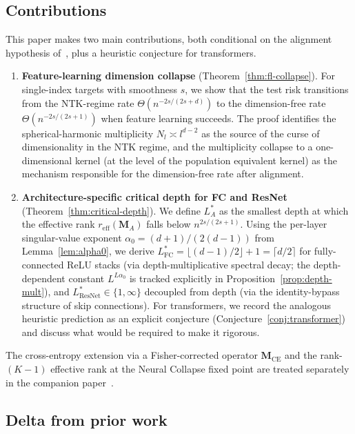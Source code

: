 \documentclass[12pt]{amsart}
\theoremstyle{definition}
\theoremstyle{remark}
\newcommand{\bM}{\mathbf{M}}
\begin{document}
\subsection{Contributions}

This paper makes two main contributions, both conditional on the
alignment hypothesis of~\cite{paperB}, plus a heuristic conjecture for
transformers.

\begin{enumerate}[label=(\roman*)]
\item \textbf{Feature-learning dimension collapse}
  (Theorem~\ref{thm:fl-collapse}). For single-index targets with smoothness
  $s$, we show that the test risk transitions from the NTK-regime rate
  $\Theta(n^{-2s/(2s+d)})$ to the dimension-free rate
  $\Theta(n^{-2s/(2s+1)})$ when feature learning succeeds. The proof
  identifies the spherical-harmonic multiplicity $N_{l} \asymp l^{d-2}$ as
  the source of the curse of dimensionality in the NTK regime, and
  the multiplicity collapse to a one-dimensional kernel (at the level of
  the population equivalent kernel) as the mechanism responsible for the
  dimension-free rate after alignment.

\item \textbf{Architecture-specific critical depth for FC and ResNet}
  (Theorem~\ref{thm:critical-depth}). We define $L^{*}_{A}$ as the smallest
  depth at which the effective rank $r_{\mathrm{eff}}(\bM_{A})$ falls
  below $n^{2s/(2s+1)}$. Using the per-layer singular-value exponent
  $\alpha_{0} = (d+1)/(2(d-1))$ from Lemma~\ref{lem:alpha0}, we derive
  $L^{*}_{\mathrm{FC}} = \lfloor(d-1)/2\rfloor + 1 = \lceil d/2 \rceil$
  for fully-connected ReLU stacks (via depth-multiplicative spectral
  decay; the depth-dependent constant $L^{L\alpha_{0}}$ is tracked
  explicitly in Proposition~\ref{prop:depth-mult}), and
  $L^{*}_{\mathrm{ResNet}} \in \{1,\infty\}$ decoupled from depth (via the
  identity-bypass structure of skip connections).
  For transformers, we record the analogous heuristic prediction as an
  explicit conjecture (Conjecture~\ref{conj:transformer}) and discuss
  what would be required to make it rigorous.
\end{enumerate}

The cross-entropy extension via a Fisher-corrected operator
$\bM_{\mathrm{CE}}$ and the rank-$(K-1)$ effective rank at the Neural
Collapse fixed point are treated separately in the companion
paper~\cite{paperD}.

\subsection{Delta from prior work}\label{sec:delta}
\end{document}
